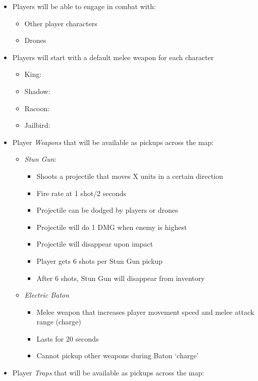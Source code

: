 \documentclass[14pts]{report}
\begin{document}
\begin{itemize}
    \item Players will be able to engage in combat with:
    \begin{itemize}
        \item Other player characters
        \item Drones
    \end{itemize}
    \item Players will start with a default melee weapon for each character
    \begin{itemize}
        \item King:
        \item Shadow:
        \item Racoon:
        \item Jailbird:
    \end{itemize}
    \item Player \emph{Weapons} that will be available as pickups across the map:
    \begin{itemize}
        \item \emph{Stun Gun}:
        \begin{itemize}
            \item Shoots a projectile that moves X units in a certain direction
            \item Fire rate at 1 shot/2 seconds
            \item Projectile can be dodged by players or drones
            \item Projectile will do 1 DMG when enemy is highest
            \item Projectile will disappear upon impact
            \item Player gets 6 shots per Stun Gun pickup
            \item After 6 shots, Stun Gun will disappear from inventory
        \end{itemize}
        \item \emph{Electric Baton}
        \begin{itemize}
            \item Melee weapon that increases player movement speed and melee attack range (charge)
            \item Lasts for 20 seconds
            \item Cannot pickup other weapons during Baton `charge'
        \end{itemize}
    \end{itemize}
    \item Player \emph{Traps} that will be available as pickups across the map:

\end{itemize}
\end{document}
